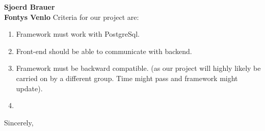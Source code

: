 \documentclass[11pt]{letter} %
\begin{document}
\begin{letter}{\large \bfseries Sjoerd Brauer\\ Fontys Venlo }
		Criteria for our project are:
		\begin{enumerate}
			\item Framework must work with PostgreSql.
			\item Front-end should be able to communicate with backend.
			\item Framework must be backward compatible. (as our project will highly likely be carried on by a different group. Time might pass and framework might update).
			\item
		\end{enumerate}
	
		\closing{Sincerely,}
		
		
		
		
		
		
		







	

		
		
		
		
		
		
	\end{letter}
	
\end{document}
